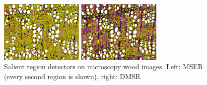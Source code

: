 \documentclass{article}
\begin{document}
\begin{figure}[htb]

\begin{minipage}[b]{.49\linewidth}
  \centering
  \centerline{\includegraphics[width=4.0cm]{./Figs/mserWood}}
\end{minipage}
\hfill
\begin{minipage}[b]{0.49\linewidth}
  \centering
  \centerline{\includegraphics[width=4.0cm]{./Figs/dmsrWood}}
\end{minipage}
\caption{Salient region detectors on microscopy wood images. Left: MSER (every second region is shown), right: DMSR}
\label{fig:wood}
%
\end{figure}








\end{document}
